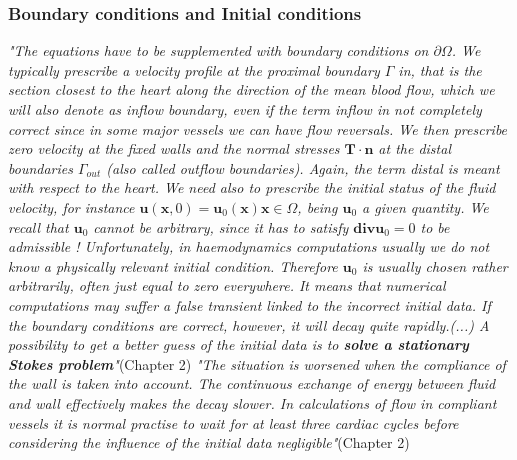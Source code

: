 \documentclass[11pt,letterpaper]{article}
\begin{document}
\subsubsection*{Boundary conditions and Initial conditions} \textit{"The equations have to be supplemented with boundary conditions on $\partial  \Omega$.
We typically prescribe a velocity profile at the proximal boundary $\Gamma$ in, that is the section closest to the heart along the direction of the mean blood flow, which we will also denote as inflow boundary, even if the term inflow in not completely correct since in some major vessels we can have flow reversals. We then prescribe zero velocity at the fixed walls and the normal stresses $\bm{T} \cdot \bm{n}$ at the distal boundaries $\Gamma_{out}$  (also called outflow boundaries). Again, the term distal is meant with respect to the heart.\newline\newline
We need also to prescribe the initial status of the fluid velocity, for instance
$\bm{u}(\bm{x}, 0) = \bm{u}_0(\bm{x}) \bm{x} \in \Omega$,
being $\bm{u}_0$ a given quantity. We recall that $\bm{u}_0$  cannot be arbitrary, since it has to satisfy $\bm{div}\bm{u}_0  = 0$ to be admissible
! Unfortunately, in haemodynamics computations usually we do not know a
physically relevant initial condition. Therefore  $\bm{u}_0$ is usually chosen rather arbitrarily, often just equal to zero everywhere. It means that numerical computations may suffer a false transient linked to the incorrect initial data. If the boundary conditions are correct, however, it will decay quite rapidly.(...) A possibility to get a better guess of the initial data is to \textbf{solve a stationary Stokes problem}"}(Chapter 2) \newline\newline
\textit{"The situation is worsened when the compliance of the wall is taken into
account. The continuous exchange of energy between fluid and wall effectively makes the decay slower. In calculations of flow in compliant vessels it is normal practise to wait for at least three cardiac cycles before considering the influence of the initial data negligible"}(Chapter 2)
\end{document}
